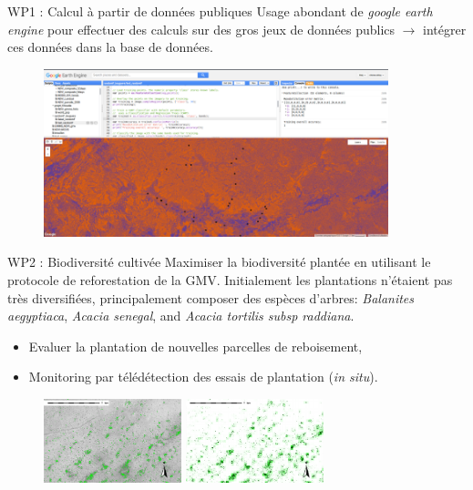 \documentclass[newPxFont]{beamer}
\begin{document}
\begin{frame}[c]{WP1 : Calcul à partir de données publique}s
\vspace{-2em}
Usage abondant de \textit{google earth engine} pour effectuer des calculs sur des gros jeux de données publics $\rightarrow$ intégrer ces données dans la base de données.
\vspace{-1em}
\begin{figure}
	\centering
	\includegraphics[width = 10cm]{img/ggearthengine}
\end{figure}
\end{frame}

\begin{frame}[c]{WP2 : Biodiversité cultivé}e
\vspace{-2em}
Maximiser la biodiversité plantée en utilisant le protocole de reforestation de la GMV. Initialement les plantations n'étaient pas très diversifiées, principalement composer des espèces d'arbres: \textit{Balanites aegyptiaca}, \textit{Acacia senegal}, and \textit{Acacia tortilis subsp raddiana}.
\begin{itemize}
  \item Evaluer la plantation de nouvelles parcelles de reboisement,
  \item Monitoring par télédétection des essais de plantation (\textit{in situ}).
\end{itemize}
\begin{figure}
	\centering
	\includegraphics[width = 4cm]{img/Trees_sup15m2}
  \includegraphics[width = 4cm]{img/GRID_Trees_sup15m2}
\end{figure}
\end{frame}
\end{document}
